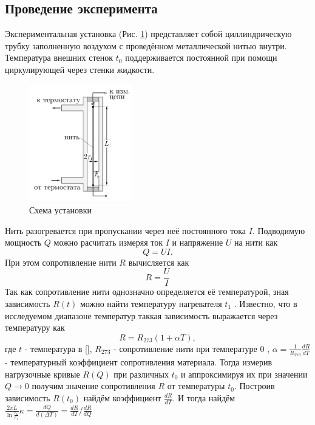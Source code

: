 \documentclass[12pt]{article}
\begin{document}
\subsection{Проведение эксперимента}
Экспериментальная установка (Рис. \ref{fig:2}) представляет собой 
циллиндрическую трубку заполненную воздухом с проведённом металлической нитью внутри.
Температура внешних стенок $t_0$ 
поддерживается постоянной при помощи циркулирующей через стенки жидкости.
\begin{figure}[H]
    \centering
    \includegraphics[width=0.4\textwidth]{2.png}
    \caption{Схема установки}
    \label{fig:2}
\end{figure} 
Нить разогревается при пропускании через неё постоянного тока $I$.
Подводимую мощность $Q$  можно расчитать измеряя ток $I$ и напряжение $U$ на нити как
\begin{equation}
    Q = UI.
    \label{eq:6}
\end{equation}
При этом сопротивление нити $R$ вычисляется как
\begin{equation}
    R = \frac{U}{I}
    \label{eq:7}
\end{equation}  
Так как сопротивление нити однозначно определяется её температурой, зная зависимость $R(t)$ можно найти температуру нагревателя $t_1$ . 
Известно, что в исследуемом диапазоне температур таккая зависимость выражается через температуру как
\begin{equation}
    R = R_{273} (1 + \alpha T), 
    \label{eq:RT}
\end{equation}
где $t$ - температура в [\textcelsius], $R_{273}$ - сопротивление нити при температуре $0$ \textcelsius, 
$\alpha = \frac{1}{R_{273}}\frac{dR}{dT}$ - температурный коэффициент сопротивления материала. 
Тогда измерив нагрузочные кривые $R(Q)$ при различных $t_0$ и аппроксимируя их при значении $Q \to 0$ получим 
значение сопротивления $R$ от температуры $t_0$. Построив зависимость $R(t_0)$ найдём коэффициент $\frac{dR}{dT}$. И тогда 
найдём $\frac{2\pi L}{\ln \frac{r_0}{r_1}} \kappa = \frac{d Q}{d (\Delta T)} = \frac{d R}{d T} / \frac{d R}{d Q}$      
\end{document}
